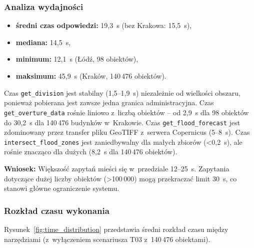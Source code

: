 \subsubsection{Analiza wydajności}

\begin{itemize}
    \item \textbf{średni czas odpowiedzi:} 19,3~s (bez Krakowa: 15,5~s),
    \item \textbf{mediana:} 14,5~s,
    \item \textbf{minimum:} 12,1~s (Łódź, 98 obiektów),
    \item \textbf{maksimum:} 45,9~s (Kraków, 140\,476 obiektów).
\end{itemize}

Czas \texttt{get\_division} jest stabilny (1,5--1,9~s) niezależnie od wielkości obszaru, ponieważ pobierana jest zawsze jedna granica administracyjna. Czas \texttt{get\_overture\_data} rośnie liniowo z~liczbą obiektów -- od 2,9~s dla 98 obiektów do 30,2~s dla 140\,476 budynków w~Krakowie. Czas \texttt{get\_flood\_forecast} jest zdominowany przez transfer pliku GeoTIFF z~serwera Copernicus (5--8~s). Czas \texttt{intersect\_flood\_zones} jest zaniedbywalny dla małych zbiorów (<0,2~s), ale rośnie znacząco dla dużych (8,2~s dla 140\,476 obiektów).

\textbf{Wniosek:} Większość zapytań mieści się w~przedziale 12--25~s. Zapytania dotyczące dużej liczby obiektów (>100\,000) mogą przekraczać limit 30~s, co stanowi główne ograniczenie systemu.

\subsubsection{Rozkład czasu wykonania}

Rysunek~\ref{fig:time_distribution} przedstawia średni rozkład czasu między narzędziami (z~wyłączeniem scenariusza T03 z~140\,476 obiektami).


